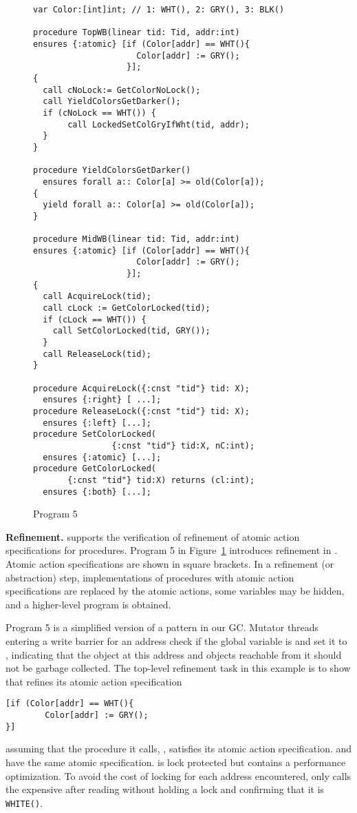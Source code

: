 \begin{figure}
\begin{verbatim}
var Color:[int]int; // 1: WHT(), 2: GRY(), 3: BLK()

procedure TopWB(linear tid: Tid, addr:int)
ensures {:atomic} [if (Color[addr] == WHT(){
                     Color[addr] := GRY();
                   }];
{
  call cNoLock:= GetColorNoLock();
  call YieldColorsGetDarker(); 
  if (cNoLock == WHT()) {
       call LockedSetColGryIfWht(tid, addr);
  }
}

procedure YieldColorsGetDarker()
  ensures forall a:: Color[a] >= old(Color[a]);
{
  yield forall a:: Color[a] >= old(Color[a]);
}

procedure MidWB(linear tid: Tid, addr:int)
ensures {:atomic} [if (Color[addr] == WHT(){
                     Color[addr] := GRY();
                   }];
{
  call AcquireLock(tid);
  call cLock := GetColorLocked(tid);
  if (cLock == WHT()) {
    call SetColorLocked(tid, GRY());
  } 
  call ReleaseLock(tid);
}

procedure AcquireLock({:cnst "tid"} tid: X);
  ensures {:right} [ ...];
procedure ReleaseLock({:cnst "tid"} tid: X);
  ensures {:left} [...];
procedure SetColorLocked(
                {:cnst "tid"} tid:X, nC:int); 
  ensures {:atomic} [...];
procedure GetColorLocked(
       {:cnst "tid"} tid:X) returns (cl:int);
  ensures {:both} [...];

\end{verbatim}
\caption{Program 5}
\label{fig:reft}
\end{figure}

%

{\bf Refinement.} 
\civl supports the verification of refinement of atomic action specifications for
procedures. Program 5 in Figure~\ref{fig:reft} introduces refinement in \civl. 
Atomic action specifications are shown in square brackets. 
In a refinement (or abstraction) step, implementations of procedures with atomic action
specifications are replaced by the atomic actions, some variables may
be hidden, and a higher-level program is obtained. 

Program 5 is a simplified version of a pattern in our GC.
Mutator threads entering a write barrier for an
address  check
if the global variable  is 
and set it to , indicating that the object at this address
and objects reachable from it should not be garbage collected. The
top-level refinement task in this example is to show that 
refines its atomic action specification 
\begin{verbatim}
[if (Color[addr] == WHT(){
        Color[addr] := GRY();
}]
\end{verbatim}
assuming that the procedure it calls, , satisfies its
atomic action specification.  and  have the same atomic
specification.   is lock protected but  contains a
performance optimization. 
To avoid the cost of locking for each
address encountered, 
 only calls the expensive 
 after reading  without holding a lock
and confirming that it is {\tt WHITE()}.


